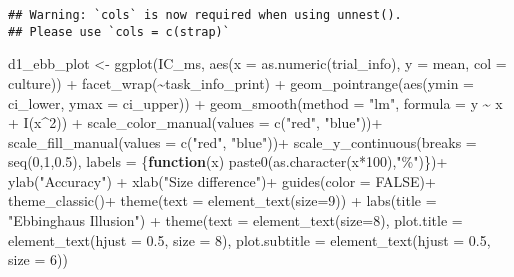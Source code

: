 \documentclass[
]{article}
\newenvironment{Shaded}{\begin{snugshade}}{\end{snugshade}}
\newcommand{\AttributeTok}[1]{\textcolor[rgb]{0.77,0.63,0.00}{#1}}
\newcommand{\ConstantTok}[1]{\textcolor[rgb]{0.00,0.00,0.00}{#1}}
\newcommand{\ControlFlowTok}[1]{\textcolor[rgb]{0.13,0.29,0.53}{\textbf{#1}}}
\newcommand{\DecValTok}[1]{\textcolor[rgb]{0.00,0.00,0.81}{#1}}
\newcommand{\FloatTok}[1]{\textcolor[rgb]{0.00,0.00,0.81}{#1}}
\newcommand{\FunctionTok}[1]{\textcolor[rgb]{0.00,0.00,0.00}{#1}}
\newcommand{\NormalTok}[1]{#1}
\newcommand{\OtherTok}[1]{\textcolor[rgb]{0.56,0.35,0.01}{#1}}
\newcommand{\SpecialCharTok}[1]{\textcolor[rgb]{0.00,0.00,0.00}{#1}}
\newcommand{\StringTok}[1]{\textcolor[rgb]{0.31,0.60,0.02}{#1}}
\begin{document}
\begin{verbatim}
## Warning: `cols` is now required when using unnest().
## Please use `cols = c(strap)`
\end{verbatim}

\begin{Shaded}
\begin{Highlighting}[]
\NormalTok{d1\_ebb\_plot }\OtherTok{\textless{}{-}} \FunctionTok{ggplot}\NormalTok{(IC\_ms, }\FunctionTok{aes}\NormalTok{(}\AttributeTok{x =} \FunctionTok{as.numeric}\NormalTok{(trial\_info), }\AttributeTok{y =}\NormalTok{ mean, }\AttributeTok{col =}\NormalTok{ culture)) }\SpecialCharTok{+} 
  \FunctionTok{facet\_wrap}\NormalTok{(}\SpecialCharTok{\textasciitilde{}}\NormalTok{task\_info\_print) }\SpecialCharTok{+} 
  \FunctionTok{geom\_pointrange}\NormalTok{(}\FunctionTok{aes}\NormalTok{(}\AttributeTok{ymin =}\NormalTok{ ci\_lower, }\AttributeTok{ymax =}\NormalTok{ ci\_upper)) }\SpecialCharTok{+} 
  \FunctionTok{geom\_smooth}\NormalTok{(}\AttributeTok{method =} \StringTok{"lm"}\NormalTok{, }\AttributeTok{formula =}\NormalTok{ y }\SpecialCharTok{\textasciitilde{}}\NormalTok{ x }\SpecialCharTok{+} \FunctionTok{I}\NormalTok{(x}\SpecialCharTok{\^{}}\DecValTok{2}\NormalTok{)) }\SpecialCharTok{+} 
  \FunctionTok{scale\_color\_manual}\NormalTok{(}\AttributeTok{values =} \FunctionTok{c}\NormalTok{(}\StringTok{"red"}\NormalTok{, }\StringTok{"blue"}\NormalTok{))}\SpecialCharTok{+}
\FunctionTok{scale\_fill\_manual}\NormalTok{(}\AttributeTok{values =} \FunctionTok{c}\NormalTok{(}\StringTok{"red"}\NormalTok{, }\StringTok{"blue"}\NormalTok{))}\SpecialCharTok{+}
  \FunctionTok{scale\_y\_continuous}\NormalTok{(}\AttributeTok{breaks =} \FunctionTok{seq}\NormalTok{(}\DecValTok{0}\NormalTok{,}\DecValTok{1}\NormalTok{,}\FloatTok{0.5}\NormalTok{), }
                     \AttributeTok{labels =}\NormalTok{ \{}\ControlFlowTok{function}\NormalTok{(x) }\FunctionTok{paste0}\NormalTok{(}\FunctionTok{as.character}\NormalTok{(x}\SpecialCharTok{*}\DecValTok{100}\NormalTok{),}\StringTok{"\%"}\NormalTok{)\})}\SpecialCharTok{+}
  \FunctionTok{ylab}\NormalTok{(}\StringTok{"Accuracy"}\NormalTok{) }\SpecialCharTok{+} 
\FunctionTok{xlab}\NormalTok{(}\StringTok{"Size difference"}\NormalTok{)}\SpecialCharTok{+}
  \FunctionTok{guides}\NormalTok{(}\AttributeTok{color =} \ConstantTok{FALSE}\NormalTok{)}\SpecialCharTok{+}
\FunctionTok{theme\_classic}\NormalTok{()}\SpecialCharTok{+}
  \FunctionTok{theme}\NormalTok{(}\AttributeTok{text =} \FunctionTok{element\_text}\NormalTok{(}\AttributeTok{size=}\DecValTok{9}\NormalTok{)) }\SpecialCharTok{+} 
   \FunctionTok{labs}\NormalTok{(}\AttributeTok{title =} \StringTok{"Ebbinghaus Illusion"}\NormalTok{) }\SpecialCharTok{+}
\FunctionTok{theme}\NormalTok{(}\AttributeTok{text =} \FunctionTok{element\_text}\NormalTok{(}\AttributeTok{size=}\DecValTok{8}\NormalTok{),}
      \AttributeTok{plot.title =} \FunctionTok{element\_text}\NormalTok{(}\AttributeTok{hjust =} \FloatTok{0.5}\NormalTok{, }\AttributeTok{size =} \DecValTok{8}\NormalTok{), }
      \AttributeTok{plot.subtitle =} \FunctionTok{element\_text}\NormalTok{(}\AttributeTok{hjust =} \FloatTok{0.5}\NormalTok{, }\AttributeTok{size =} \DecValTok{6}\NormalTok{))  }
\end{Highlighting}
\end{Shaded}
\end{document}
